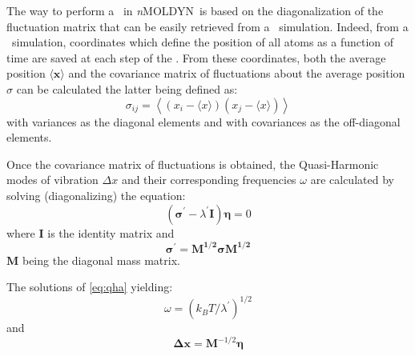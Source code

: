 \documentclass[a4paper,11pt]{report}
\newcommand{\NMOLDYN}{\textit{n}MOLDYN}
\begin{document}
The way to perform a \QHA\ in \NMOLDYN\ is based on the diagonalization of the fluctuation matrix that can be easily retrieved 
from a \MD\ simulation. Indeed, from a \MD\ simulation, coordinates which define the position of all atoms as a function of time are
saved at each step of the \MD . From these coordinates, both the average position $\langle \mathbf{x} \rangle$ and the 
covariance matrix of fluctuations about the average position $\sigma$  can be calculated the latter being defined as:
\begin{equation}
\sigma_{ij} = \left\langle \left ( x_{i} - \langle x \rangle \right ) \left ( x_{j} - \langle x \rangle \right )\right\rangle
\end{equation}
with variances as the diagonal elements and with covariances as the off-diagonal elements.

Once the covariance matrix of fluctuations is obtained, the Quasi-Harmonic modes of vibration $\Delta x$ and their 
corresponding frequencies $\omega$ are calculated by solving (diagonalizing) the equation:
\begin{equation}
\label{eq:qha}
\left ( \mathbf{\sigma^{\prime}} - \lambda^{\prime} \mathbf{I}\right )\mathbf{\eta} = 0
\end{equation}
where $\mathbf{I}$ is the identity matrix and 
\begin{equation}
\mathbf{\sigma^{\prime}} = \mathbf{M^{1/2}} \mathbf{\sigma} \mathbf{M^{1/2}}
\end{equation}
$\mathbf{M}$ being the diagonal mass matrix.

The solutions of \ref{eq:qha} yielding:
\begin{equation}
\label{eq:qha_omega}
\omega = \left (k_{B}T/\lambda^{\prime} \right )^{1/2}
\end{equation}
and
\begin{equation}
\label{eq:qha_dx}
\mathbf{\Delta x} = \mathbf{M}^{-1/2}\mathbf{\eta}
\end{equation}
\end{document}
